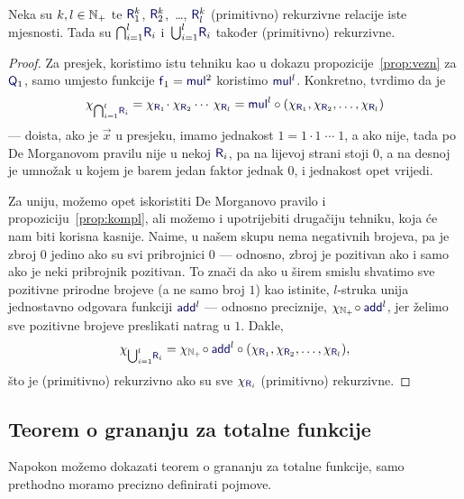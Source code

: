 \begin{propozicija}[{name=[višestruke unije i presjeci čuvaju (primitivnu) rekurzivnost]}]\label{prop:skupl}
Neka su $k,l\in{\mathbb N}_+$ te $\f R_1^k$, $\f R_2^k$,~\ldots, $\f R_l^k$ (primitivno) rekurzivne relacije iste mjesnosti. Tada su $\bigcap_{i=1}^l\!\f R_i$ i\, $\bigcup_{i=1}^l\!\f R_i$ također (primitivno) rekurzivne.
\end{propozicija}
\begin{proof}
Za presjek, koristimo istu tehniku kao u dokazu propozicije~\ref{prop:vezn} za $\f Q_1$, samo umjesto funkcije $\f f_1=\f{mul}^2$ koristimo $\f{mul}^l$. Konkretno, tvrdimo da je \begin{equation}
    \chi_{\bigcap_{i=1}^l\!\f R_i}=\chi_{\f R_1}\!\cdot\chi_{\f R_2}\dotsb\,\chi_{\f R_l}=\f{mul}^l\circ(\chi_{\f R_1},\chi_{\f R_2},\dotsc,\chi_{\f R_l})
\end{equation}
    --- doista, ako je $\vec x$ u presjeku, imamo jednakost $1=1\cdot1\mathbin{\dotsb}1$, a ako nije, tada po De Morganovom pravilu nije u nekoj $\f{R}_i$, pa na lijevoj strani stoji $0$, a na desnoj je umnožak u kojem je barem jedan faktor jednak $0$, i jednakost opet vrijedi.

Za uniju, možemo opet iskoristiti De Morganovo pravilo i propoziciju~\ref{prop:kompl}, ali možemo i upotrijebiti drugačiju tehniku, koja će nam biti korisna kasnije. Naime, u našem skupu nema negativnih brojeva, pa je zbroj $0$ jedino ako su svi pribrojnici $0$ --- odnosno, zbroj je pozitivan ako i samo ako je neki pribrojnik pozitivan. To znači da ako u širem smislu shvatimo sve pozitivne prirodne brojeve (a ne samo broj $1$) kao istinite, $l$-struka unija jednostavno odgovara funkciji $\f{add}^l$ --- odnosno preciznije, $\chi_{\N_+}\!\circ\f{add}^l$, jer želimo sve pozitivne brojeve preslikati natrag u $1$. Dakle,
\begin{equation}
\label{eq:unk}
    \chi_{\bigcup_{i=1}^l\!\f R_i}=\chi_{\N_+}\!\circ\f{add}^l\circ(\chi_{\f R_1},\chi_{\f R_2},\dotsc,\chi_{\f R_l})\text,
\end{equation}
što je (primitivno) rekurzivno ako su sve $\chi_{\f R_i}$ (primitivno) rekurzivne.
\end{proof}

\subsection{Teorem o grananju za totalne funkcije}

Napokon možemo dokazati teorem o grananju za totalne funkcije, samo prethodno moramo precizno definirati pojmove.

